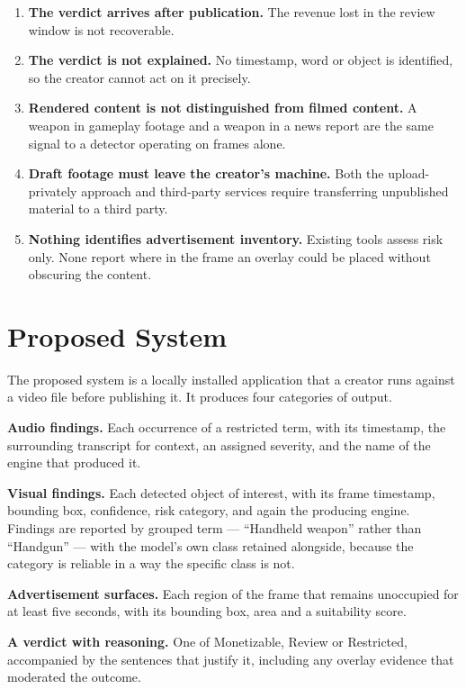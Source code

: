 \documentclass[
12pt,
a4paper,
oneside
]{report}
\begin{document}
\begin{enumerate}[itemsep=3pt]
\item \textbf{The verdict arrives after publication.} The revenue lost in the
review window is not recoverable.
\item \textbf{The verdict is not explained.} No timestamp, word or object is
identified, so the creator cannot act on it precisely.
\item \textbf{Rendered content is not distinguished from filmed content.} A
weapon in gameplay footage and a weapon in a news report are the same signal to
a detector operating on frames alone.
\item \textbf{Draft footage must leave the creator's machine.} Both the
upload-privately approach and third-party services require transferring
unpublished material to a third party.
\item \textbf{Nothing identifies advertisement inventory.} Existing tools assess
risk only. None report where in the frame an overlay could be placed without
obscuring the content.
\end{enumerate}

\section{Proposed System}

The proposed system is a locally installed application that a creator runs
against a video file before publishing it. It produces four categories of
output.

\textbf{Audio findings.} Each occurrence of a restricted term, with its
timestamp, the surrounding transcript for context, an assigned severity, and the
name of the engine that produced it.

\textbf{Visual findings.} Each detected object of interest, with its frame
timestamp, bounding box, confidence, risk category, and again the producing
engine. Findings are reported by grouped term --- ``Handheld weapon'' rather
than ``Handgun'' --- with the model's own class retained alongside, because the
category is reliable in a way the specific class is not.

\textbf{Advertisement surfaces.} Each region of the frame that remains
unoccupied for at least five seconds, with its bounding box, area and a
suitability score.

\textbf{A verdict with reasoning.} One of Monetizable, Review or Restricted,
accompanied by the sentences that justify it, including any overlay evidence
that moderated the outcome.
\end{document}
